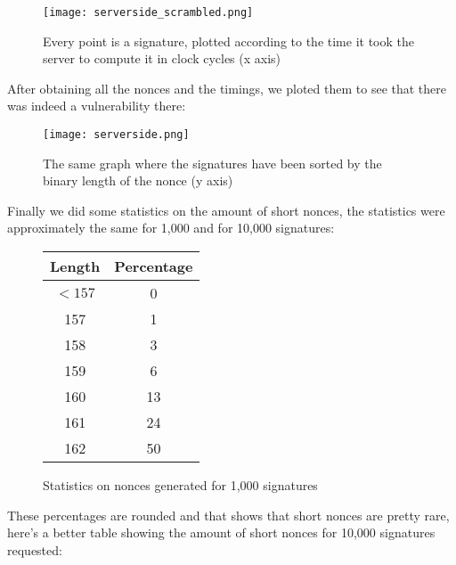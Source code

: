 \documentclass[a4paper,11pt]{article}
\begin{document}
\begin{figure}[H]
\texttt{[image: serverside\_scrambled.png]}
\caption{Every point is a signature, plotted according to the time it took the server to compute it in clock cycles (x axis)}
\end{figure}

After obtaining all the nonces and the timings, we ploted them to see that there was indeed a vulnerability there:

\begin{figure}[H]
\texttt{[image: serverside.png]}
\caption{The same graph where the signatures have been sorted by the binary length of the nonce (y axis)}
\end{figure}

Finally we did some statistics on the amount of short nonces, the statistics were approximately the same for 1,000 and for 10,000 signatures:

\begin{figure}[H]
\begin{center} 
\begin{tabular}{@{} *2c @{}}
\toprule
 Length & Percentage \\ 
\midrule
$<157$&     0          \\
157&     1          \\
158&     3          \\
159&     6          \\
160&       13         \\
161&     24         \\
162&        50
\bottomrule
\end{tabular}
\end{center} 
\caption{Statistics on nonces generated for 1,000 signatures}
\end{figure}
These percentages are rounded and that shows that short nonces are pretty rare, here's a better table showing the amount of short nonces for 10,000 signatures requested:
\end{document}
